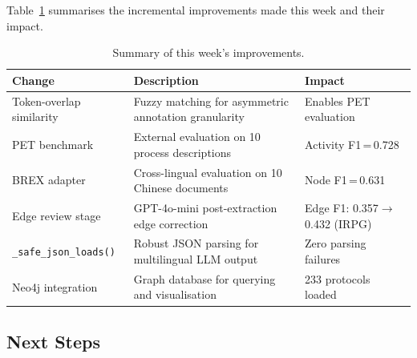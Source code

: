\documentclass[12pt,a4paper]{article}
\begin{document}
Table~\ref{tab:improvements-summary} summarises the incremental improvements made this week and their impact.

\begin{table}[H]
\centering
\caption{Summary of this week's improvements.}
\label{tab:improvements-summary}
\begin{tabularx}{\textwidth}{l X l}
\toprule
\textbf{Change} & \textbf{Description} & \textbf{Impact} \\
\midrule
Token-overlap similarity & Fuzzy matching for asymmetric annotation granularity & Enables PET evaluation \\
\addlinespace
PET benchmark & External evaluation on 10 process descriptions & Activity F1\,=\,0.728 \\
\addlinespace
BREX adapter & Cross-lingual evaluation on 10 Chinese documents & Node F1\,=\,0.631 \\
\addlinespace
Edge review stage & GPT-4o-mini post-extraction edge correction & Edge F1: 0.357$\rightarrow$0.432 (IRPG) \\
\addlinespace
\texttt{\_safe\_json\_loads()} & Robust JSON parsing for multilingual LLM output & Zero parsing failures \\
\addlinespace
Neo4j integration & Graph database for querying and visualisation & 233 protocols loaded \\
\bottomrule
\end{tabularx}
\end{table}

\subsection{Next Steps}
\label{sec:next-steps-week}
\end{document}
